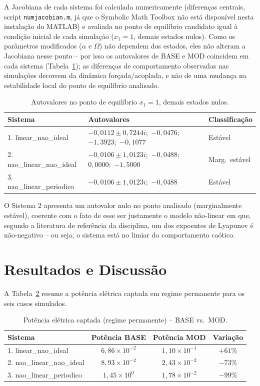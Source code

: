 \documentclass[a4paper,11pt]{article}
\begin{document}
A Jacobiana de cada sistema foi calculada numericamente (diferenças
centrais, script \texttt{numjacobian.m}, já que o Symbolic Math Toolbox
não está disponível nesta instalação do MATLAB) e avaliada no ponto de
equilíbrio candidato igual à condição inicial de cada simulação
($x_1=1$, demais estados nulos). Como os parâmetros modificados
($\alpha$ e $\Omega$) não dependem dos estados, eles não alteram a
Jacobiana nesse ponto -- por isso os autovalores de BASE e MOD
coincidem em cada sistema (Tabela~\ref{tab:autovalores2}); as
diferenças de comportamento observadas nas simulações decorrem da
dinâmica forçada/acoplada, e não de uma mudança na estabilidade local
do ponto de equilíbrio analisado.

\begin{table}[h]
\centering
\caption{Autovalores no ponto de equilíbrio $x_1=1$, demais estados nulos.}
\label{tab:autovalores2}
\begin{tabular}{lll}
\toprule
\textbf{Sistema} & \textbf{Autovalores} & \textbf{Classificação} \\
\midrule
1. linear\_nao\_ideal & $-0{,}0112\pm0{,}7244i$;\ $-0{,}0476$;\ $-1{,}3923$;\ $-0{,}1077$ & Estável \\
2. nao\_linear\_nao\_ideal & $-0{,}0106\pm1{,}0123i$;\ $-0{,}0488$;\ $0{,}0000$;\ $-1{,}5000$ & Marg.\ estável \\
3. nao\_linear\_periodico & $-0{,}0106\pm1{,}0123i$;\ $-0{,}0488$ & Estável \\
\bottomrule
\end{tabular}
\end{table}

O Sistema 2 apresenta um autovalor nulo no ponto analisado (marginalmente
estável), coerente com o fato de esse ser justamente o modelo não-linear
em que, segundo a literatura de referência da disciplina, um dos
expoentes de Lyapunov é não-negativo -- ou seja, o sistema está no
limiar do comportamento caótico.

\section{Resultados e Discussão}

A Tabela~\ref{tab:resultados2} resume a potência elétrica captada em
regime permanente para os seis casos simulados.

\begin{table}[h]
\centering
\caption{Potência elétrica captada (regime permanente) -- BASE vs.\ MOD.}
\label{tab:resultados2}
\begin{tabular}{lccc}
\toprule
\textbf{Sistema} & \textbf{Potência BASE} & \textbf{Potência MOD} & \textbf{Variação} \\
\midrule
1. linear\_nao\_ideal        & $6{,}86\times10^{-2}$ & $1{,}10\times10^{-1}$ & $+61\%$ \\
2. nao\_linear\_nao\_ideal    & $8{,}93\times10^{-2}$ & $2{,}43\times10^{-2}$ & $-73\%$ \\
3. nao\_linear\_periodico     & $1{,}45\times10^{0}$  & $1{,}78\times10^{-2}$ & $-99\%$ \\
\bottomrule
\end{tabular}
\end{table}
\end{document}

